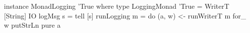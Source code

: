 \begin{code}
instance MonadLogging 'True where
  type LoggingMonad 'True = WriterT [String] IO
  logMsg s = tell [s]
  runLogging m = do
    (a, w) <- runWriterT m
    for_ w putStrLn
    pure a
\end{code}
